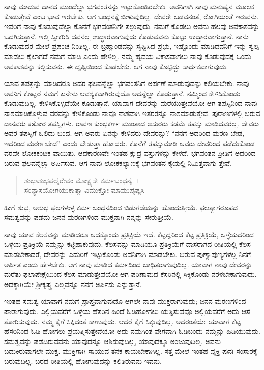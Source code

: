 ನಾವು ಮಾಡುವ ದಾನದ ಮುಂದೆಲ್ಲಾ ಭಗವಂತನನ್ನು ಇಟ್ಟುಕೊಂಡಿರಬೇಕು. ಅವನಿಗಾಗಿ ನಾವು ಮನುಷ್ಯನ ಮೂಲಕ ಕೊಡುತ್ತೇವೆ ಎಂಬ ಭಾವ ಇರಬೇಕು. ಆಗ ಬಂಧನಕ್ಕೆ ಬೀಳುವುದಿಲ್ಲ. ದೇವರೇ ಬಡವನಂತೆ, ರೋಗಿಯಂತೆ ಇರುವನು. ಇವರಿಗೆ ನಾವು ಕೊಡುವುದೆಲ್ಲಾ ಕೊನೆಗೆ ಭಗವಂತನಿಗೇ ಸಲ್ಲುವುದು. ನಮಗೆ ಕೊಡಲು ಅವನು ಹಲವು ಅವಕಾಶವನ್ನು ಒದಗಿಸುತ್ತಾನೆ. ಇಲ್ಲಿ ಸ್ವೀಕರಿಸಿ ದವನಲ್ಲ ಉದ್ಧಾರವಾಗುವುದು ಕೊಡುವವನು ಕೊಟ್ಟು ಉದ್ಧಾರವಾಗುತ್ತಾನೆ. ನಾನು ಕೊಡುವುದರ ಮೇಲೆ ಪ್ರಪಂಚ ನಿಂತಿಲ್ಲ. ಈ ಬ್ರಹ್ಮಾಂಡವನ್ನು ಸೃಷ್ಟಿಸಿದ ಪ್ರಭು, ಇಷ್ಟೊಂದು ಮಾಡಿದವನಿಗೆ ಇನ್ನು ಸ್ವಲ್ಪ ಮಾಡಲು ಕೈಲಾಗದೆ ನಮಗೆ ಮಾಡಿ ಎಂದು ಹೇಳಿಲ್ಲ. ನಮ್ಮ ಹೃದಯ ವಿಕಾಸವಾಗಲು ನಾವು ಕೊಡುವುದಕ್ಕೆ ಒಂದು ಅವಕಾಶವನ್ನು ಕಲ್ಪಿಸುವನು. ಈ ದೃಷ್ಟಿಯಿಂದ ಕೊಡಬೇಕು. ಆಗ ನಾವು ಕೊಟ್ಟಿದ್ದು ಸಾರ್ಥಕವಾಗುವುದು.

ಯಾವ ತಪಸ್ಸನ್ನು ಮಾಡಿದರೂ ಅದರ ಫಲವನ್ನೆಲ್ಲಾ ಭಗವಂತನಿಗೆ ಅರ್ಪಣೆ ಮಾಡುವುದನ್ನು ಕಲಿಯಬೇಕು. ನಾವು ಅವನಿಗೆ ಕೊಟ್ಟರೆ ನಮಗೆ ಏನೇನು ಆವಶ್ಯಕವಾಗಿರುವುದೊ ಅದನ್ನೆಲ್ಲಾ ಕೊಡುತ್ತಾನೆ. ನಮ್ಮಿಂದ ಕೇಳಿಸಿಕೊಂಡು ಕೊಡುವುದಿಲ್ಲ, ಕೇಳಿಸಿಕೊಳ್ಳದೆಯೇ ಕೊಡುತ್ತಾನೆ. ಯಾವಾಗ ದೇವರನ್ನು ಮರೆಯುತ್ತೇವೆಯೋ ಆಗ ತಪಸ್ಸಿನಿಂದ ನಾವು ನಾಶಮಾಡಿಕೊಳ್ಳುವ ವರವನ್ನು ಕೇಳಿಕೊಂಡು ನಾವೂ ನಾಶವಾಗಿ ಇತರರನ್ನೂ ನಾಶಮಾಡುತ್ತೇವೆ. ಪುರಾಣಗಳಲ್ಲಿ ಬರುವ ದಾನವರು ಕಠೋರ ತಪಸ್ವಿಗಳು. ರಾವಣ ಕುಂಭಕರ್ಣ ಮುಂತಾದ ಅಸುರರು ಕಡಮೆ ತಪಸ್ಸು ಮಾಡಿದವರಲ್ಲ. ದೇವರು ಅವರ ತಪಸ್ಸಿಗೆ ಒಲಿದು ಬಂದ. ಆಗ ಅವರು ಏನನ್ನು ಕೇಳಿದರು ದೇವರನ್ನು? “ನನಗೆ ಅದರಿಂದ ಮರಣ ಬೇಡ, ಇದರಿಂದ ಮರಣ ಬೇಡ” ಎಂದು ಬೇಡುತ್ತಾ ಹೋದರು. ಕೊನೆಗೆ ತಪಸ್ಸುಮಾಡಿ ಅವರು ದೇವರಿಂದ ಪಡೆದುಕೊಂಡ ವರವೇ ಲೋಕಕಂಟಕ ವಾಯಿತು. ಆದಕಾರಣವೇ ಇಂತಹ ಕ್ಷುದ್ರ ವಸ್ತುಗಳನ್ನು ಕೇಳದೆ, ಭಗವಂತನ ಪ್ರೀತಿಗೆ ಅದರಿಂದ ಬರುವ ಫಲವನ್ನೆಲ್ಲಾ ಅರ್ಪಿಸುವ. ಆಗ ನಾವು ಲೋಕಕಲ್ಯಾಣಕ್ಕೆ ಭಗವಂತನ ಕೈಯಲ್ಲಿ ನಿಮಿತ್ತವಾಗು ತ್ತೇವೆ.

\begin{verse}
ಶುಭಾಶುಭಫಲೈರೇವಂ ಮೋಕ್ಷ್ಯಸೇ ಕರ್ಮಬಂಧನೈಃ ।\\ಸಂನ್ಯಾಸಯೋಗಯುಕ್ತಾತ್ಮಾ ವಿಮುಕ್ತೋ ಮಾಮುಪೈಷ್ಯಸಿ 
\end{verse}

{\small ಹೀಗೆ ಶುಭ, ಅಶುಭ ಫಲಗಳುಳ್ಳ ಕರ್ಮ ಬಂಧನದಿಂದ ಬಿಡುಗಡೆಯನ್ನು ಹೊಂದುತ್ತೀಯೆ. ಫಲತ್ಯಾಗರೂಪದ ಸಮತ್ವವನ್ನು ಪಡೆದು ಜನನ ಮರಣಗಳಿಂದ ಮುಕ್ತನಾಗಿ ನನ್ನನ್ನು ಸೇರುತ್ತೀಯೆ.}

ನಾವು ಯಾವ ಕೆಲಸವನ್ನು ಮಾಡಿದರೂ ಅದಕ್ಕೊಂದು ಪ್ರತಿಕ್ರಿಯೆ ಇದೆ. ಕೆಟ್ಟದ್ದರಿಂದ ಕೆಟ್ಟ ಪ್ರತಿಕ್ರಿಯೆ, ಒಳ್ಳೆಯದರಿಂದ ಒಳ್ಳೆಯ ಪ್ರತಿಕ್ರಿಯೆ ನಮ್ಮನ್ನು ಕಟ್ಟಿಹಾಕುವುದು. ಕೆಲಸವನ್ನು ಮಾಡಿಯೂ ಪ್ರತಿಕ್ರಿಯೆಗೆ ದಾಸರಾಗದ ರೀತಿಯಲ್ಲಿ ಕೆಲಸ ಮಾಡಬೇಕಾದರೆ, ದೇವರನ್ನು ಎದುರಿಗೆ ಇಟ್ಟುಕೊಂಡು ಅವನಿಗಾಗಿ ಮಾಡಬೇಕು. ಬರುವ ಪುಣ್ಯಾಪುಣ್ಯಗಳೆಲ್ಲ ನಿನಗೆ ಅರ್ಪಿತ ಎಂದು ಹೇಳಬೇಕು. ಆಗ ನಾವು ಮಾಡಿದ ಕರ್ಮದಿಂದ ಬಾಧಿತರಾಗುವುದಿಲ್ಲ. ಯಾವಾಗ ನಾವು ದೇವರನ್ನು ಮರೆತು ಫಲಾಪೇಕ್ಷೆಯಿಂದ ಕೆಲಸ ಮಾಡುತ್ತೇವೆಯೋ ಆಗ ಪರಿಣಾಮದ ಕೆಸರಿನಲ್ಲಿ ಸಿಕ್ಕಿಕೊಂಡು ನರಳಬೇಕಾಗುವುದು. ಅದಕ್ಕಾಗಿಯೇ ಶ್ರೀಕೃಷ್ಣ ಎಲ್ಲವನ್ನೂ ನನಗೆ ಅರ್ಪಿಸು ಎನ್ನುತ್ತಾನೆ.

ಇಂತಹ ಸಮತ್ವ ಯಾವಾಗ ನಮಗೆ ಪ್ರಾಪ್ತವಾಗುವುದೊ ಆಗಲೇ ನಾವು ಮುಕ್ತರಾಗುವುದು; ಜನನ ಮರಣಗಳಿಂದ ಪಾರಾಗುವುದು. ಎಲ್ಲಿಯವರೆಗೆ ಒಳ್ಳೆಯ ಹೆಸರಿನ ಹಿಂದೆ ಓಡಿಹೋಗಲು ಯತ್ನಿಸುವೆವೊ ಅಲ್ಲಿಯವರೆಗೆ ಅದು ಆಸೆ ತೋರಿಸುವುದು. ನಮ್ಮ ಕೈಗೆ ಸಿಕ್ಕಿದಂತೆ ಕಾಣುವುದು. ಆದರೆ ಕೈಗೆ ಸಿಕ್ಕುವುದಿಲ್ಲ. ಅದರಂತೆಯೇ ಯಾವಾಗ ಕೆಟ್ಟ ಹೆಸರಿನಿಂದ ಓಡಿ ಹೋಗಲು ಪ್ರಯತ್ನಿಸುತ್ತೇವೆಯೋ ಅದು ನಮಗಿಂತ ವೇಗವಾಗಿ ಓಡಿಬಂದು ನಮ್ಮನ್ನು ಹಿಡಿಯುವುದು. ಸಮತ್ವವನ್ನು ಪಡೆದಿರುವವನು ಯಾವುದನ್ನೂ ಆಶಿಸುವುದಿಲ್ಲ, ಯಾವುದಕ್ಕೂ ಅಂಜುವುದಿಲ್ಲ. ಅವನು ಬದುಕಿರುವಾಗಲೇ ಮುಕ್ತ. ಮುಕ್ತಿಗಾಗಿ ಸಾಯುವ ತನಕ ಕಾಯಬೇಕಾಗಿಲ್ಲ. ಸತ್ತ ಮೇಲೆ ಇಂತಹ ವ್ಯಕ್ತಿ ಪುನಃ ಸಂಸಾರಕ್ಕೆ ಬರುವುದಿಲ್ಲ. ಬರದ ರೀತಿಯಲ್ಲಿ ಹೋಗುವುದನ್ನು ಕಲಿತಿರುವನು ಇವನು.

